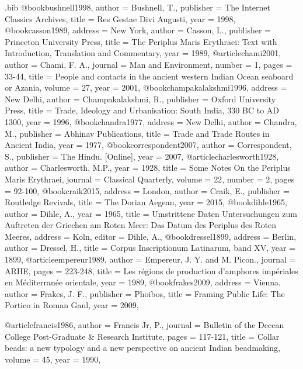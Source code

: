 \begin{filecontents}{\IJSRAidentifier.bib}
@book{bushnell1998,
	author = {Bushnell, T.},
	publisher = {The Internet Classics Archives},
	title = {Res Gestae Divi Augusti},
	year = {1998},
}
@book{casson1989,
	address = {New York},
	author = {Casson, L.},
	publisher = {Princeton University Press},
	title = {The Periplus Maris Erythraei: Text with Introduction, Translation and Commentary},
	year = {1989},
}
@article{chami2001,
	author = {Chami, F. A.},
	journal = {Man and Environment},
	number = {1},
	pages = {33-44},
	title = {People and contacts in the ancient western Indian Ocean seaboard or Azania},
	volume = {27},
	year = {2001},
}
@book{champakalakshmi1996,
	address = {New Delhi},
	author = {Champakalakshmi, R.},
	publisher = {Oxford University Press},
	title = {Trade, Ideology and Urbanisation: South India, 330 BC to AD 1300},
	year = {1996},
}
@book{chandra1977,
	address = {New Delhi},
	author = {Chandra, M.},
	publisher = {Abhinav Publications},
	title = {Trade and Trade Routes in Ancient India},
	year = {1977},
}
@book{correspondent2007,
	author = {Correspondent, S.},
	publisher = {The Hindu. [Online]},
	year = {2007},
}
@article{charlesworth1928,
	author = {Charlesworth, M.P.},
	year = {1928},
	title = {Some Notes On the Periplus Maris Erythraei},
	journal = {Classical Quarterly},
	volume = {22},
	number = {2},
	pages = {92-100},
}
@book{craik2015,
	address = {London},
	author = {Craik, E.},
	publisher = {Routledge Revivals},
	title = {The Dorian Aegean},
	year = {2015},
}
@book{dihle1965,
	author = {Dihle, A.},
	year = {1965},
	title = {Umstrittene Daten Untersuchungen zum Auftreten der Griechen am Roten Meer: Das Datum des Periplus des Roten Meeres},
	address = {Koln},
	editor = {Dihle, A.},
}
@book{dressel1899,
	address = {Berlin},
	author = {Dressel, H.},
	title = {Corpus Inscriptionum Latinarum, band XV},
	year = {1899},
}
@article{empereur1989,
	author = {Empereur, J. Y. and M. Picon.},
	journal = {ARHE},
	pages = {223-248},
	title = {Les régions de production d'amphores impériales en Méditerranée orientale},
	year = {1989},
}
@book{frakes2009,
	address = {Vienna},
	author = {Frakes, J. F.},
	publisher = {Phoibos},
	title = {Framing Public Life: The Portico in Roman Gaul},
	year = {2009},
}

@article{francis1986,
	author = {Francis Jr, P.},
	journal = {Bulletin of the Deccan College Post-Graduate \& Research Institute},
	pages = {117-121},
	title = {Collar beads: a new typology and a new perspective on ancient Indian beadmaking},
	volume = {45},
	year = {1990},
}


\end{filecontents}
